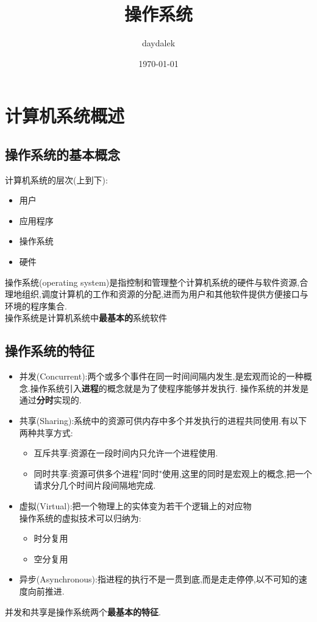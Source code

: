 \documentclass{ctexart}
\begin{document}
\title{操作系统}
\author{daydalek}
\date{\today}
\maketitle

\section{计算机系统概述}
\subsection{操作系统的基本概念}
计算机系统的层次(上到下):
\begin{itemize}
    \item 用户
    \item 应用程序
    \item 操作系统
    \item 硬件
\end {itemize}
操作系统(operating system)是指控制和管理整个计算机系统的硬件与软件资源,合理地组织,调度计算机的工作和资源的分配,进而为用户和其他软件提供方便接口与环境的程序集合.\\
操作系统是计算机系统中\textbf{最基本的}系统软件
\subsection{操作系统的特征}
\begin{itemize}
    \item 并发(Concurrent):两个或多个事件在同一时间间隔内发生,是宏观而论的一种概念.操作系统引入\textbf{进程}的概念就是为了使程序能够并发执行.
    操作系统的并发是通过\textbf{分时}实现的.
    \item 共享(Sharing):系统中的资源可供内存中多个并发执行的进程共同使用.有以下两种共享方式:\\
    \begin{itemize}
        \item 互斥共享:资源在一段时间内只允许一个进程使用.
        \item 同时共享:资源可供多个进程"同时"使用,这里的同时是宏观上的概念,把一个请求分几个时间片段间隔地完成.
    \end{itemize}
    \item 虚拟(Virtual):把一个物理上的实体变为若干个逻辑上的对应物\\
    操作系统的虚拟技术可以归纳为:
    \begin{itemize}
        \item 时分复用
        \item 空分复用 
    \end{itemize}
    \item 异步(Asynchronous):指进程的执行不是一贯到底,而是走走停停,以不可知的速度向前推进.
\end{itemize}
并发和共享是操作系统两个\textbf{最基本的特征}.
\end{document}
